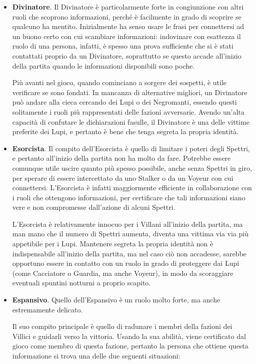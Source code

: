 \documentclass[a4paper,10pt]{article}
\begin{document}
\begin{itemize}
	\item {\bf Divinatore}. Il Divinatore è particolarmente forte in congiunzione con altri ruoli che scoprono informazioni, perché è facilmente in grado di scoprire se qualcuno ha mentito. Inizialmente ha senso usare le frasi per connettersi ad un buono certo con cui scambiare informazioni: indovinare con esattezza il ruolo di una persona, infatti, è spesso una prova sufficiente che si è stati contattati proprio da un Divinatore, soprattutto se questo accade all'inizio della partita quando le informazioni disponibili sono poche.
	
	Più avanti nel gioco, quando cominciano a sorgere dei sospetti, è utile verificare se sono fondati. In mancanza di alternative migliori, un Divinatore può andare alla cieca cercando dei Lupi o dei Negromanti, essendo questi solitamente i ruoli più rappresentati delle fazioni avversarie. Avendo un'alta capacità di confutare le dichiarazioni fasulle, il Divinatore è una delle vittime preferite dei Lupi, e pertanto è bene che tenga segreta la propria identità.
	
	\item {\bf Esorcista}. Il compito dell'Esorcista è quello di limitare i poteri degli Spettri, e pertanto all'inizio della partita non ha molto da fare. Potrebbe essere comunque utile uscire quanto più spesso possibile, anche senza Spettri in giro, per sperare di essere intercettato da uno Stalker o da un Voyeur con cui connettersi. L'Esorcista è infatti maggiormente efficiente in collaborazione con i ruoli che ottengono informazioni, per certificare che tali informazioni siano vere e non compromesse dall'azione di alcuni Spettri.
	
	L'Esorcista è relativamente innocuo per i Villani all'inizio della partita, ma man mano che il numero di Spettri aumenta, diventa una vittima via via più appetibile per i Lupi. Mantenere segreta la propria identità non è indispensabile all'inizio della partita, ma nel caso ciò non accadesse, sarebbe opportuno essere in contatto con un ruolo in grado di proteggere dai Lupi (come Cacciatore o Guardia, ma anche Voyeur), in modo da scoraggiare eventuali spuntini notturni a proprio scapito.
	
	\item {\bf Espansivo}. Quello dell'Espansivo è un ruolo molto forte, ma anche estremamente delicato. 
	
	Il suo compito principale è quello di radunare i membri della fazioni dei Villici e guidarli verso la vittoria. Usando la sua abilità, viene certificato dal gioco come membro di questa fazione, pertanto 
	la persona che ottiene questa informazione si trova una delle due seguenti situazioni:
	

\end{itemize}
\end{document}
